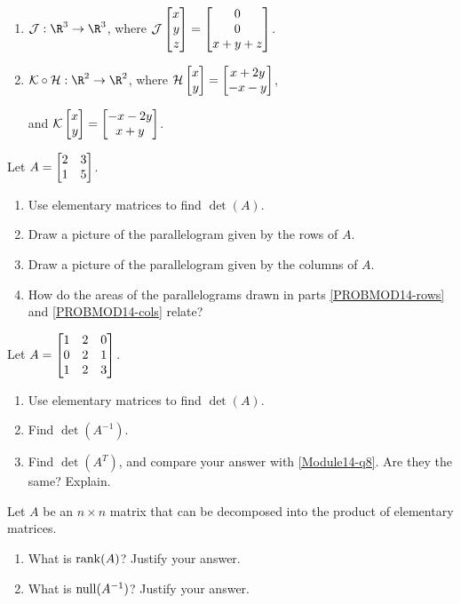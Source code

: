 \begin{exercises}
\begin{problist}
\begin{enumerate}
			\item $\mathcal{J}:\R^{3}\to\R^{3}$, where
				$\mathcal{J}\mat{x\\y\\z}=\matc{0\\0\\x+y+z}$.

			\item $\mathcal{K}\circ \mathcal{H}:\R^{2}\to\R^{2}$, where
				$\mathcal{H}\mat{x\\y}=\matc{x+2y\\-x-y}$,

				and $\mathcal{K}\mat{x\\y}=\matc{-x-2y\\x+y}$.
		\end{enumerate}

		\prob Let $A=\mat{2&3\\1&5}$.
		\begin{enumerate}
			\item Use elementary matrices to find $\det(A)$.

			\item Draw a picture of the parallelogram given by the rows of $A$.
				\label{PROBMOD14-rows}

			\item Draw a picture of the parallelogram given by the columns of $A$.
				\label{PROBMOD14-cols}

			\item How do the areas of the parallelograms drawn in parts \ref{PROBMOD14-rows}
				and \ref{PROBMOD14-cols} relate?
		\end{enumerate}

		\prob Let $A=\mat{1&2&0\\0&2&1\\1&2&3}$.
		\begin{enumerate}
			\item \label{Module14-q8} Use elementary matrices to find $\det(A)$.

			\item Find $\det(A^{-1})$.

			\item Find $\det(A^{T})$, and compare your answer with
				\ref{Module14-q8}. Are they the same? Explain.
		\end{enumerate}

		\prob Let $A$ be an $n \times n$ matrix that can be decomposed into the
		product of elementary matrices.
		\begin{enumerate}
			\item What is $\operatorname{rank}(A)$? Justify your answer.

			\item What is $\operatorname{null}(A^{-1})$? Justify your answer.
		\end{enumerate}
		
	\end{problist}
\end{exercises} 